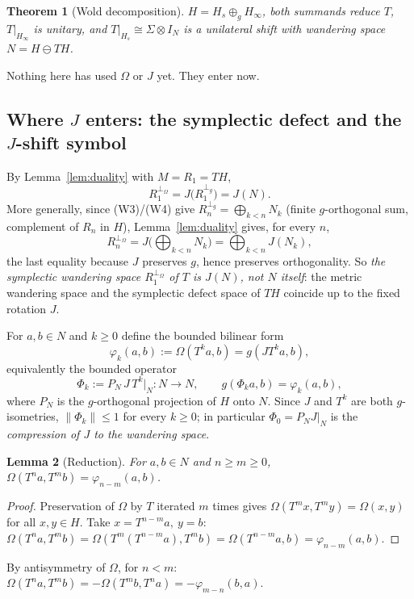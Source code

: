 \documentclass[11pt,a4paper]{article}
\newtheorem{theorem}{Theorem}[section]
\newtheorem{lemma}[theorem]{Lemma}
\theoremstyle{definition}
\theoremstyle{remark}
\newcommand{\cJ}{J}
\newcommand{\Om}{\Omega}
\newcommand{\pO}{\perp_\Omega}
\newcommand{\pg}{\perp_g}
\begin{document}
\begin{theorem}[Wold decomposition]
\label{thm:A}
$H=H_s\oplus_gH_\infty$, both summands reduce $T$, $T|_{H_\infty}$ is unitary, and
$T|_{H_s}\cong\Sigma\otimes I_N$ is a unilateral shift with wandering space $N=H\ominus TH$.
\end{theorem}

Nothing here has used $\Om$ or $\cJ$ yet. They enter now.

\subsection{Where $\cJ$ enters: the symplectic defect and the $J$-shift symbol}
\label{sec:jshift}

By Lemma~\ref{lem:duality} with $M=R_1=TH$,
\[
R_1^{\pO}=\cJ\big(R_1^{\pg}\big)=\cJ(N).
\]
More generally, since (W3)/(W4) give $R_n^{\pg}=\bigoplus_{k<n}N_k$ (finite $g$-orthogonal
sum, complement of $R_n$ in $H$), Lemma~\ref{lem:duality} gives, for every $n$,
\[
R_n^{\pO}=\cJ\Big(\bigoplus_{k<n}N_k\Big)=\bigoplus_{k<n}\cJ(N_k),
\]
the last equality because $\cJ$ preserves $g$, hence preserves orthogonality. So
\emph{the symplectic wandering space $R_1^{\pO}$ of $T$ is $\cJ(N)$, not $N$ itself}: the
metric wandering space and the symplectic defect space of $TH$ coincide up to the fixed
rotation $\cJ$.

For $a,b\in N$ and $k\ge0$ define the bounded bilinear form
\[
\varphi_k(a,b):=\Om(T^{k}a,b)=g(\cJ T^ka,b),
\]
equivalently the bounded operator
\[
\Phi_k:=P_N\,\cJ\,T^{k}\big|_N:N\to N,\qquad g(\Phi_ka,b)=\varphi_k(a,b),
\]
where $P_N$ is the $g$-orthogonal projection of $H$ onto $N$. Since $\cJ$ and $T^{k}$ are
both $g$-isometries, $\|\Phi_k\|\le1$ for every $k\ge0$; in particular $\Phi_0=P_N\cJ|_N$ is
the \emph{compression of $\cJ$ to the wandering space}.

\begin{lemma}[Reduction]
\label{lem:reduction}
For $a,b\in N$ and $n\ge m\ge0$, $\Om(T^na,T^mb)=\varphi_{n-m}(a,b)$.
\end{lemma}
\begin{proof}
Preservation of $\Om$ by $T$ iterated $m$ times gives $\Om(T^mx,T^my)=\Om(x,y)$ for all
$x,y\in H$. Take $x=T^{n-m}a,\ y=b$:
$\Om(T^na,T^mb)=\Om(T^m(T^{n-m}a),T^mb)=\Om(T^{n-m}a,b)=\varphi_{n-m}(a,b)$.
\end{proof}

By antisymmetry of $\Om$, for $n<m$: $\Om(T^na,T^mb)=-\Om(T^mb,T^na)=-\varphi_{m-n}(b,a)$.
\end{document}

